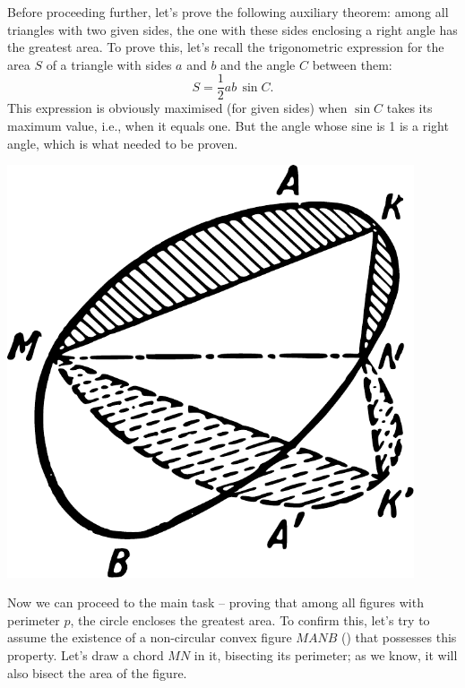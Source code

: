 Before proceeding further, let's prove the following auxiliary theorem: among all triangles with two given sides, the one with these sides enclosing a right angle has the greatest area. To prove this, let's recall the trigonometric expression for the area \(S\) of a triangle with sides \(a\) and \(b\) and the angle \(C\) between them:
\begin{equation*}%
S = \frac{1}{2} ab \, \sin C.
\end{equation*}
This expression is obviously maximised (for given sides) when \(\sin C\) takes its maximum value, i.e., when it equals one. But the angle whose sine is 1 is a right angle, which is what needed to be proven.

\begin{marginfigure}[-3cm]%
\centering
\includegraphics[width=0.9\textwidth]{figures/ch-12/fig-179.pdf}
\end{marginfigure}

Now we can proceed to the main task -- proving that among all figures with perimeter \(p\), the circle encloses the greatest area. To confirm this, let's try to assume the existence of a non-circular convex figure \(MANB\) () that possesses this property. Let's draw a chord \(MN\) in it, bisecting its perimeter; as we know, it will also bisect the area of the figure.




